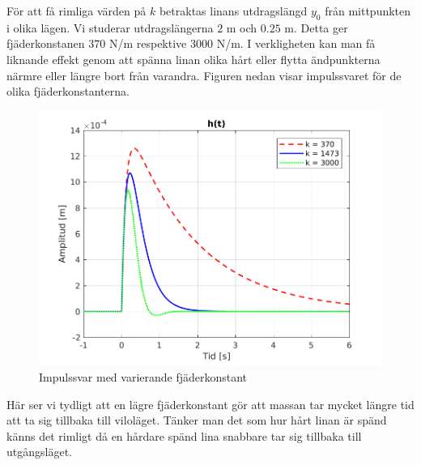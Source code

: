 \newpage
För att få rimliga värden på $k$ betraktas linans utdragslängd $y_0$ från mittpunkten i olika lägen. Vi studerar utdragslängerna $2$ m och $0.25$ m. Detta ger fjäderkonstanen $370$ N/m respektive $3000$ N/m. I verkligheten kan man få liknande effekt genom att spänna linan olika hårt eller flytta ändpunkterna närmre eller längre bort från varandra. Figuren nedan visar impulssvaret för de olika fjäderkonstanterna.
\begin{figure}[H] 
    \centering
    \includegraphics[scale=0.9]{bilder/impulssvar_variation_k}
    \caption{Impulssvar med varierande fjäderkonstant}
    \label{fig:impulssvar_variation_k}
\end{figure}
Här ser vi tydligt att en lägre fjäderkonstant gör att massan tar mycket längre tid att ta sig tillbaka till viloläget. Tänker man det som hur hårt linan är spänd känns det rimligt då en hårdare spänd lina snabbare tar sig tillbaka till utgångsläget. 

